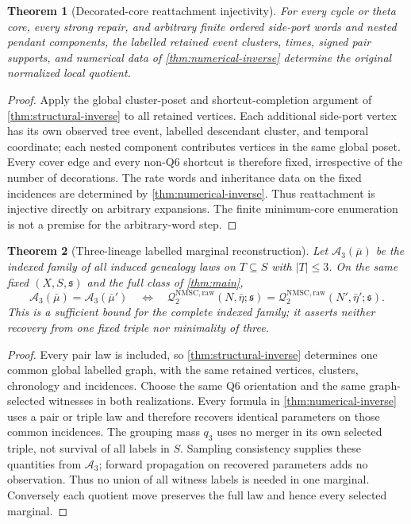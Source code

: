\documentclass[11pt]{article}
\newtheorem{theorem}{Theorem}[section]
\newcommand{\Qraw}{\mathcal Q^{\mathrm{NMSC,raw}}_2}
\begin{document}
\begin{theorem}[Decorated-core reattachment injectivity]
\label{thm:reattach}
For every cycle or theta core, every strong repair, and arbitrary finite
ordered side-port words and nested pendant components, the labelled retained
event clusters, times, signed pair supports, and numerical data of
\cref{thm:numerical-inverse} determine the original normalized local quotient.
\end{theorem}
\begin{proof}
Apply the global cluster-poset and shortcut-completion argument of
\cref{thm:structural-inverse} to all retained vertices.  Each additional
side-port vertex has its own observed tree event, labelled descendant cluster,
and temporal coordinate; each nested component contributes vertices in the
same global poset.  Every cover edge and every non-Q6 shortcut is therefore
fixed, irrespective of the number of decorations.  The rate words and
inheritance data on the fixed incidences are determined by
\cref{thm:numerical-inverse}.  Thus reattachment is injective directly on
arbitrary expansions.  The finite minimum-core enumeration is not a premise
for the arbitrary-word step.
\end{proof}

\begin{theorem}[Three-lineage labelled marginal reconstruction]
\label{cor:three-suffice}\label{thm:three}
Let $\mathcal A_3(\bar\mu)$ be the indexed family of all induced genealogy
laws on $T\subseteq S$ with $|T|\le3$. On the same fixed
$(X,S,\mathfrak s)$ and the full class of \cref{thm:main},
\[
 \mathcal A_3(\bar\mu)=\mathcal A_3(\bar\mu')
 \quad\Longleftrightarrow\quad
 \Qraw(N,\bar\eta;\mathfrak s)=\Qraw(N',\bar\eta';\mathfrak s).
\]
This is a sufficient bound for the complete indexed family; it asserts
neither recovery from one fixed triple nor minimality of three.
\end{theorem}
\begin{proof}
Every pair law is included, so \cref{thm:structural-inverse} determines one
common global labelled graph, with the same retained vertices, clusters,
chronology and incidences. Choose the same Q6 orientation and the same
 graph-selected witnesses in both realizations. Every formula in
\cref{thm:numerical-inverse} uses a pair or triple law and therefore recovers
identical parameters on those common incidences. The grouping mass $q_3$
uses no merger in its own selected triple, not survival of all labels in
$S$. Sampling consistency supplies these quantities from $\mathcal A_3$;
forward propagation on recovered parameters adds no observation. Thus no
union of all witness labels is needed in one marginal. Conversely each
quotient move preserves the full law and hence every selected marginal.
\end{proof}
\end{document}
